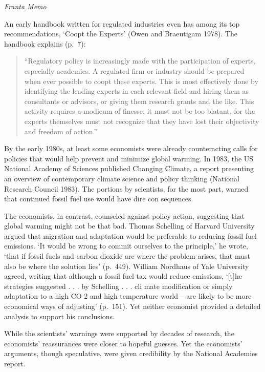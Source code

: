 \documentclass[
]{book}
\begin{document}
\emph{Franta Memo}

An early
handbook written for regulated industries even has among its top recommendations,
`Coopt the Experts' (Owen and Braeutigam 1978). The handbook explains (p.~7):

\begin{quote}
``Regulatory policy is increasingly made with the participation of experts,
especially academics. A regulated firm or industry should be prepared when­
ever possible to coopt these experts. This is most effectively done by identifying
the leading experts in each relevant field and hiring them as consultants or
advisors, or giving them research grants and the like. This activity requires
a modicum of finesse; it must not be too blatant, for the experts themselves
must not recognize that they have lost their objectivity and freedom of action.''
\end{quote}

By the early 1980s, at least some economists were already counteracting
calls for policies that would help prevent and minimize global warming. In
1983, the US National Academy of Sciences published Changing Climate,
a report presenting an overview of contemporary climate science and policy
thinking (National Research Council 1983). The portions by scientists, for
the most part, warned that continued fossil fuel use would have dire con­
sequences.

The economists, in contrast, counseled against policy action, suggesting
that global warming might not be that bad. Thomas Schelling of Harvard
University argued that migration and adaptation would be preferable to
reducing fossil fuel emissions. `It would be wrong to commit ourselves to
the principle,' he wrote, `that if fossil fuels and carbon dioxide are where the
problem arises, that must also be where the solution lies' (p.~449). William
Nordhaus of Yale University agreed, writing that although a fossil fuel tax
would reduce emissions, `{[}t{]}he strategies suggested . . . by Schelling . . . cli­
mate modification or simply adaptation to a high CO 2 and high temperature
world -- are likely to be more economical ways of adjusting' (p.~151). Yet
neither economist provided a detailed analysis to support his conclusions.

While the scientists' warnings were supported by decades of research, the
economists' reassurances were closer to hopeful guesses.
Yet the
economists' arguments, though speculative, were given credibility by the
National Academies report.
\end{document}
